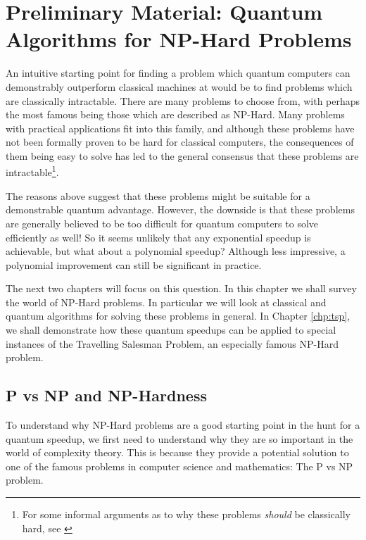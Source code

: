 \chapter{Preliminary Material: Quantum Algorithms for NP-Hard Problems}
\label{chp:prelim-q-c}

An intuitive starting point for finding a problem which quantum computers can demonstrably outperform classical machines at would be to find problems which are classically intractable. There are many problems to choose from, with perhaps the most famous being those which are described as NP-Hard. Many problems with practical applications fit into this family, and although these problems have not been formally proven to be hard for classical computers, the consequences of them being easy to solve has led to the general consensus that these problems are intractable\footnote{For some informal arguments as to why these problems \textit{should} be classically hard, see \cite{aaronson2006}}.

The reasons above suggest that these problems might be suitable for a demonstrable quantum advantage. However, the downside is that these problems are generally believed to be too difficult for quantum computers to solve efficiently as well! So it seems unlikely that any exponential speedup is achievable, but what about a polynomial speedup? Although less impressive, a polynomial improvement can still be significant in practice.

The next two chapters will focus on this question. In this chapter we shall survey the world of NP-Hard problems. In particular we will look at classical and quantum algorithms for solving these problems in general. In Chapter \ref{chp:tsp}, we shall demonstrate how these quantum speedups can be applied to special instances of the Travelling Salesman Problem, an especially famous NP-Hard problem.

\section{P vs NP and NP-Hardness}

To understand why NP-Hard problems are a good starting point in the hunt for a quantum speedup, we first need to understand why they are so important in the world of complexity theory. This is because they provide a potential solution to one of the famous problems in computer science and mathematics: The P vs NP problem.

